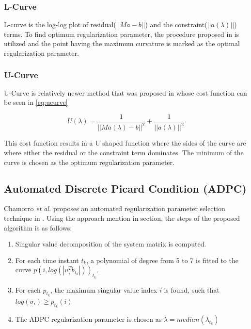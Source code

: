 \documentclass[draftcls, onecolumn, journal]{IEEEtran}
\begin{document}
\subsubsection{L-Curve}

L-curve is the log-log plot of residual($||Ma-b||$) and the constraint($||a(\lambda)||$) terms. To find optimum regularization parameter, the procedure proposed in \cite*{hansen1993use} is utilized and the point having the maximum curvature is marked as the optimal regularization parameter. 

\subsubsection{U-Curve}

U-Curve is relatively newer method that was proposed in \cite*{krawczyk2007regularization} whose cost function can be seen in \eqref{eq:ucurve}

\begin{equation}
    U(\lambda) = \frac{1}{||Ma(\lambda)-b||^2} + \frac{1}{||a(\lambda)||^2}
    \label{eq:ucurve}
\end{equation}

This cost function results in a U shaped function where the sides of the curve are where either the residual or the constraint term dominates. The minimum of the curve is chosen as the optimum regularization parameter. 

\subsection{Automated Discrete Picard Condition (ADPC)} \label{subsec:ADPC}

Chamorro \textit{et al.} proposes an automated regularization parameter selection technique in \cite*{chamorro2017improving}. Using the approach mention in  section, the steps of the proposed algorithm is as follows: 

\begin{enumerate}
    \item Singular value decomposition of the system matrix is computed.
    \item For each time instant $t_k$, a polynomial of degree from 5 to 7 is fitted to the curve $p(i,log(|u_i^Tb_{t_k}|))_{t_k}$.
    \item For each $p_{t_k}$, the maximum singular value index $i$ is found, such that $log(\sigma_i) \geq p_{t_k}(i)$
    \item The ADPC regularization parameter is chosen as $\lambda = median({\lambda_{t_k}})$
\end{enumerate}
\end{document}
